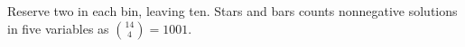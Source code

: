 Reserve two in each bin, leaving ten. Stars and bars counts nonnegative solutions in five variables as $\binom{14}{4}=\boxed{1001}$.
